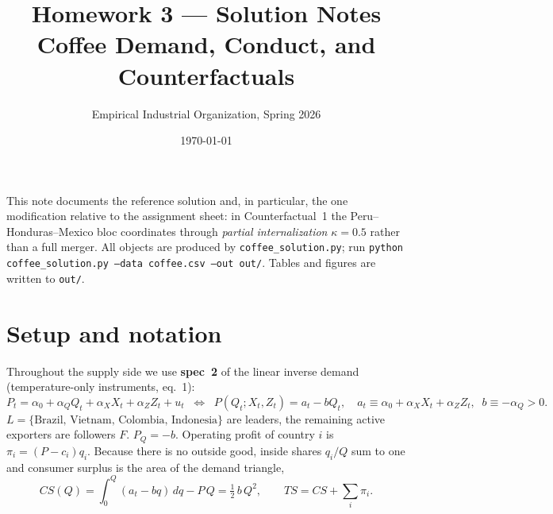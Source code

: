 \documentclass[11pt]{article}
\title{\vspace{-1.5em}Homework 3 --- Solution Notes\\
\large Coffee Demand, Conduct, and Counterfactuals}
\author{Empirical Industrial Organization, Spring 2026}
\date{\today}
\newcommand{\1}{\mathbf{1}}
\begin{document}
\maketitle
\thispagestyle{fancy}

\noindent This note documents the reference solution and, in particular, the
one modification relative to the assignment sheet: in Counterfactual~1 the
Peru--Honduras--Mexico bloc coordinates through \emph{partial internalization}
$\kappa=0.5$ rather than a full merger. All objects are produced by
\texttt{coffee\_solution.py}; run \texttt{python coffee\_solution.py --data
coffee.csv --out out/}. Tables and figures are written to \texttt{out/}.

\section{Setup and notation}
Throughout the supply side we use \textbf{spec~2} of the linear inverse demand
(temperature-only instruments, eq.~1):
\[
P_t = \alpha_0 + \alpha_Q Q_t + \alpha_X X_t + \alpha_Z Z_t + u_t
\;\;\Longleftrightarrow\;\;
P(Q_t;X_t,Z_t)=a_t - bQ_t,\quad a_t\equiv\alpha_0+\alpha_X X_t+\alpha_Z Z_t,\;\; b\equiv-\alpha_Q>0 .
\]
$L=\{\text{Brazil, Vietnam, Colombia, Indonesia}\}$ are leaders, the remaining
active exporters are followers $F$. $P_Q=-b$. Operating profit of country $i$ is
$\pi_i=(P-c_i)q_i$. Because there is no outside good, inside shares $q_i/Q$ sum
to one and consumer surplus is the area of the demand triangle,
\[
CS(Q)=\int_0^{Q}(a_t-bq)\,dq - P\,Q=\tfrac{1}{2}\,b\,Q^2,
\qquad TS=CS+\textstyle\sum_i\pi_i .
\]

\end{document}
